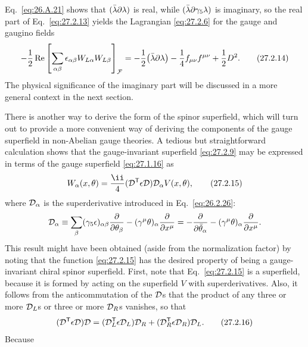 Eq.~\eqref{eq:26.A.21} shows that
\((\bar\lambda\sl{\partial}\lambda)\) is real, while
\((\bar\lambda\sl{\partial}\gamma_5\lambda)\) is imaginary, so the real
part of Eq.~\eqref{eq:27.2.13} yields the Lagrangian
\eqref{eq:27.2.6} for the gauge and gaugino fields
\begin{equation}
  -\frac12\operatorname{Re}\left[
    \sum_{\alpha\beta}\epsilon_{\alpha\beta}
      W_{L\alpha}W_{L\beta}
  \right]_{\mathcal{F}}
  =-\frac12\bigl(\bar\lambda\sl{\partial}\lambda\bigr)
  -\frac14f_{\mu\nu}f^{\mu\nu}
  +\frac12D^2.
  \tag{27.2.14}\label{eq:27.2.14}
\end{equation}
The physical significance of the imaginary part will be discussed in a
more general context in the next section.

There is another way to derive the form of the spinor superfield, which
will turn out to provide a more convenient way of deriving the components
of the gauge superfield in non-Abelian gauge theories. A tedious but
straightforward calculation shows that the gauge-invariant superfield
\eqref{eq:27.2.9} may be expressed in terms of the gauge superfield
\eqref{eq:27.1.16} as
\begin{equation}
  W_\alpha(x,\theta)
  =\frac{\ii}{4}(\SuperD^{\mathsf T}\epsilon\SuperD)
    \SuperD_\alpha V(x,\theta),
  \tag{27.2.15}\label{eq:27.2.15}
\end{equation}
where \(\mathcal{D}_\alpha\) is the superderivative introduced in
Eq.~\eqref{eq:26.2.26}:
\[
  \mathcal{D}_\alpha
  \equiv\sum_\beta(\gamma_5\epsilon)_{\alpha\beta}
    \frac{\partial}{\partial\theta_\beta}
    -(\gamma^\mu\theta)_\alpha\frac{\partial}{\partial x^\mu}
  =-\frac{\partial}{\partial\bar\theta_\alpha}
    -(\gamma^\mu\theta)_\alpha\frac{\partial}{\partial x^\mu}.
\]
This result might have been obtained (aside from the normalization factor)
by noting that the function \eqref{eq:27.2.15} has the desired property of
being a gauge-invariant chiral spinor superfield. First, note that
Eq.~\eqref{eq:27.2.15} is a superfield, because it is formed by acting on
the superfield \(V\) with superderivatives. Also, it follows from the
anticommutation of the \(\mathcal{D}\)s that the product of any three or more
\(\mathcal{D}_L\)s or three or more \(\mathcal{D}_R\)s vanishes, so that
\begin{equation}
  (\mathcal{D}^{\mathsf T}\epsilon\mathcal{D})\mathcal{D}
  =(\mathcal{D}_L^{\mathsf T}\epsilon\mathcal{D}_L)\mathcal{D}_R
  +(\mathcal{D}_R^{\mathsf T}\epsilon\mathcal{D}_R)\mathcal{D}_L.
  \tag{27.2.16}\label{eq:27.2.16}
\end{equation}
Because
